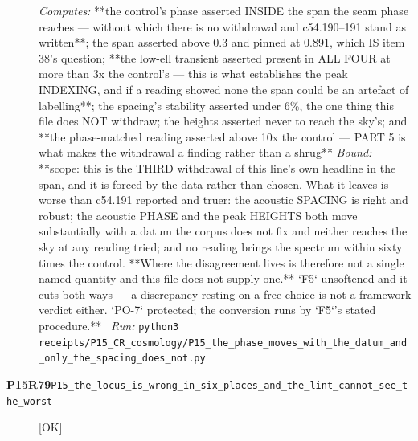 \begin{description}
\emph{Computes:} **the control's phase asserted INSIDE the span the seam phase reaches --- without which there is no withdrawal and c54.190--191 stand as written**; the span asserted above 0.3 and pinned at 0.891, which IS item 38's question; **the low-ell transient asserted present in ALL FOUR at more than 3x the control's --- this is what establishes the peak INDEXING, and if a reading showed none the span could be an artefact of labelling**; the spacing's stability asserted under 6\%, the one thing this file does NOT withdraw; the heights asserted never to reach the sky's; and **the phase-matched reading asserted above 10x the control --- PART 5 is what makes the withdrawal a finding rather than a shrug**
 \emph{Bound:} **scope: this is the THIRD withdrawal of this line's own headline in the span, and it is forced by the data rather than chosen. What it leaves is worse than c54.191 reported and truer: the acoustic SPACING is right and robust; the acoustic PHASE and the peak HEIGHTS both move substantially with a datum the corpus does not fix and neither reaches the sky at any reading tried; and no reading brings the spectrum within sixty times the control. **Where the disagreement lives is therefore not a single named quantity and this file does not supply one.** `F5` unsoftened and it cuts both ways --- a discrepancy resting on a free choice is not a framework verdict either. `PO-7` protected; the conversion runs by `F5`'s stated procedure.**
\ \emph{Run:} \texttt{python3 receipts/P15\_CR\_cosmology/P15\_the\_phase\_moves\_with\_the\_datum\_and\_only\_the\_spacing\_does\_not.py}
\item[\rcptlabel{P15_the_locus_is_wrong_in_six_places_and_the_lint_cannot_see_the_worst}{P15R79}\textbf{P15R79}\quad\texttt{P15\_the\_locus\_is\_wrong\_in\_six\_places\_and\_the\_lint\_cannot\_see\_the\_worst}]\hfill\textsf{[OK]}\\

\end{description}
